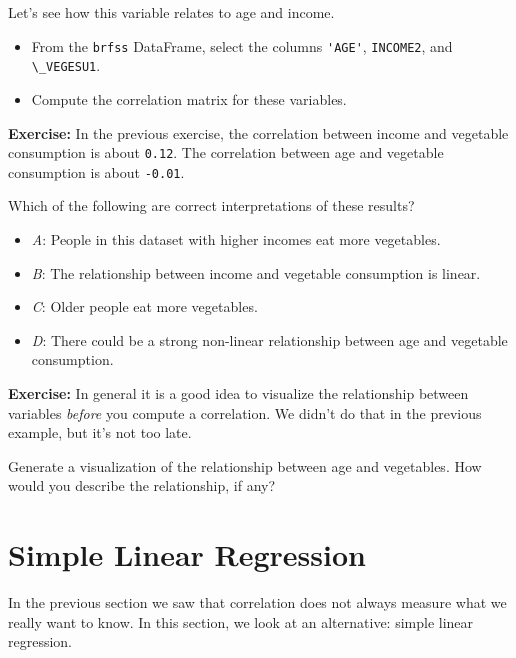 Let's see how this variable relates to age and income.

\begin{itemize}

\item
  From the \passthrough{\lstinline!brfss!} DataFrame, select the columns
  \passthrough{\lstinline!'AGE'!}, \passthrough{\lstinline!INCOME2!},
  and \passthrough{\lstinline!\_VEGESU1!}.
\item
  Compute the correlation matrix for these variables.
\end{itemize}

\textbf{Exercise:} In the previous exercise, the correlation between
income and vegetable consumption is about
\passthrough{\lstinline!0.12!}. The correlation between age and
vegetable consumption is about \passthrough{\lstinline!-0.01!}.

Which of the following are correct interpretations of these results?

\begin{itemize}

\item
  \emph{A}: People in this dataset with higher incomes eat more
  vegetables.
\item
  \emph{B}: The relationship between income and vegetable consumption is
  linear.
\item
  \emph{C}: Older people eat more vegetables.
\item
  \emph{D}: There could be a strong non-linear relationship between age
  and vegetable consumption.
\end{itemize}

\textbf{Exercise:} In general it is a good idea to visualize the
relationship between variables \emph{before} you compute a correlation.
We didn't do that in the previous example, but it's not too late.

Generate a visualization of the relationship between age and vegetables.
How would you describe the relationship, if any?

\hypertarget{simple-linear-regression}{%
\section{Simple Linear Regression}\label{simple-linear-regression}}

In the previous section we saw that correlation does not always measure
what we really want to know. In this section, we look at an alternative:
simple linear regression.

